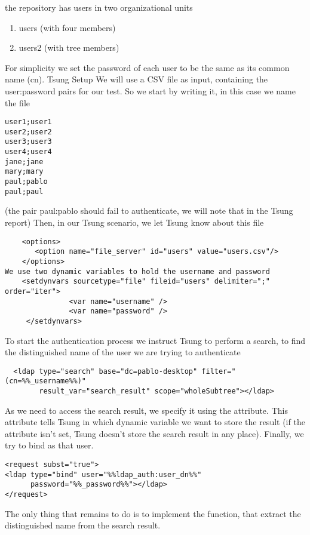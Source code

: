 \documentclass{IDXDOC-en}
\begin{document}
the repository has users in two organizational units
\begin{enumerate}
\item users (with four members)
\item users2 (with tree members)
\end{enumerate}

For simplicity we set the password of each user to be  the same as its common name (cn).
Tsung Setup
We will use a CSV file as input, containing the user:password pairs
for our test. So we start by writing it, in this case we name the file 

\begin{Verbatim}
user1;user1
user2;user2
user3;user3
user4;user4
jane;jane
mary;mary
paul;pablo
paul;paul
\end{Verbatim}

(the pair paul:pablo should fail to authenticate, we will note that in the Tsung report)
Then, in our Tsung scenario, we let Tsung know about this file

\begin{Verbatim}
    <options>
       <option name="file_server" id="users" value="users.csv"/>
    </options>
We use two dynamic variables to hold the username and password
    <setdynvars sourcetype="file" fileid="users" delimiter=";" order="iter">
               <var name="username" />
               <var name="password" />
     </setdynvars>
\end{Verbatim}

To start the authentication process we instruct Tsung to perform a search, to find the distinguished name of the user we are trying to authenticate

\begin{Verbatim}
  <ldap type="search" base="dc=pablo-desktop" filter="(cn=%%_username%%)"
        result_var="search_result" scope="wholeSubtree"></ldap>
\end{Verbatim}

As we need to access the search result, we specify it using the  attribute. This attribute tells Tsung in which dynamic variable we want to store the result (if the  attribute isn't set, Tsung doesn't store the search result in any place).
Finally,  we try to bind as that user.
\begin{Verbatim}
<request subst="true">
<ldap type="bind" user="%%ldap_auth:user_dn%%"
      password="%%_password%%"></ldap>
</request>
\end{Verbatim}
The only thing that remains to do is to implement the  function, that extract the distinguished name from the search result.
\end{document}
